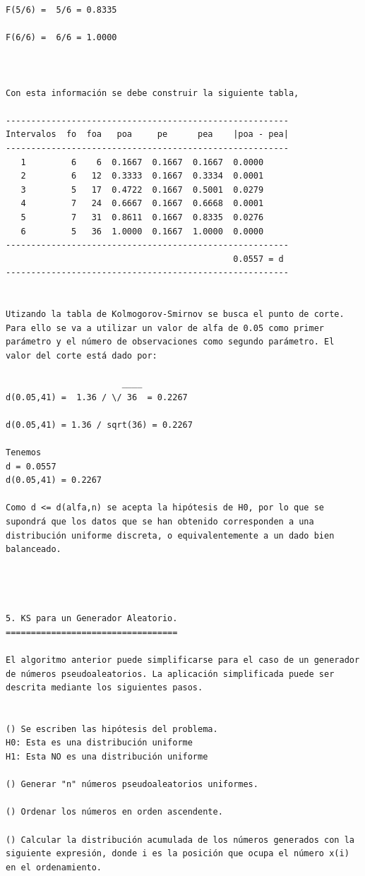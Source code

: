 \begin{verbatim}
F(5/6) =  5/6 = 0.8335

F(6/6) =  6/6 = 1.0000



Con esta información se debe construir la siguiente tabla,

--------------------------------------------------------
Intervalos  fo  foa   poa     pe      pea    |poa - pea|
--------------------------------------------------------
   1         6    6  0.1667  0.1667  0.1667  0.0000
   2         6   12  0.3333  0.1667  0.3334  0.0001
   3         5   17  0.4722  0.1667  0.5001  0.0279
   4         7   24  0.6667  0.1667  0.6668  0.0001
   5         7   31  0.8611  0.1667  0.8335  0.0276
   6         5   36  1.0000  0.1667  1.0000  0.0000
--------------------------------------------------------
                                             0.0557 = d
--------------------------------------------------------


Utizando la tabla de Kolmogorov-Smirnov se busca el punto de corte. Para ello se va a utilizar un valor de alfa de 0.05 como primer parámetro y el número de observaciones como segundo parámetro. El valor del corte está dado por:

                       ____
d(0.05,41) =  1.36 / \/ 36  = 0.2267

d(0.05,41) = 1.36 / sqrt(36) = 0.2267

Tenemos
d = 0.0557
d(0.05,41) = 0.2267

Como d <= d(alfa,n) se acepta la hipótesis de H0, por lo que se supondrá que los datos que se han obtenido corresponden a una distribución uniforme discreta, o equivalentemente a un dado bien balanceado.




5. KS para un Generador Aleatorio.
==================================

El algoritmo anterior puede simplificarse para el caso de un generador de números pseudoaleatorios. La aplicación simplificada puede ser descrita mediante los siguientes pasos.


() Se escriben las hipótesis del problema.
H0: Esta es una distribución uniforme
H1: Esta NO es una distribución uniforme
 
() Generar "n" números pseudoaleatorios uniformes.

() Ordenar los números en orden ascendente.

() Calcular la distribución acumulada de los números generados con la siguiente expresión, donde i es la posición que ocupa el número x(i) en el ordenamiento.


\end{verbatim}
